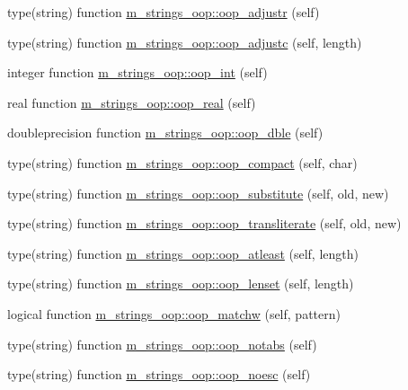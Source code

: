 \begin{DoxyCompactItemize}
\item 
type(string) function \mbox{\hyperlink{namespacem__strings__oop_abb0dfa5646259e4fc768700eada111ac}{m\+\_\+strings\+\_\+oop\+::oop\+\_\+adjustr}} (self)
\item 
type(string) function \mbox{\hyperlink{namespacem__strings__oop_a9fa932c23648e737230553a8e7bfb15b}{m\+\_\+strings\+\_\+oop\+::oop\+\_\+adjustc}} (self, length)
\item 
integer function \mbox{\hyperlink{namespacem__strings__oop_a2092266bec4014f74b8d436c5a8e319f}{m\+\_\+strings\+\_\+oop\+::oop\+\_\+int}} (self)
\item 
real function \mbox{\hyperlink{namespacem__strings__oop_a9709a714bc825704651b00c7384a7547}{m\+\_\+strings\+\_\+oop\+::oop\+\_\+real}} (self)
\item 
doubleprecision function \mbox{\hyperlink{namespacem__strings__oop_aa6eaf2b8a12a905d0ebaa21a84871dec}{m\+\_\+strings\+\_\+oop\+::oop\+\_\+dble}} (self)
\item 
type(string) function \mbox{\hyperlink{namespacem__strings__oop_ac02aecbaebcf57833b544de4f50c89a6}{m\+\_\+strings\+\_\+oop\+::oop\+\_\+compact}} (self, char)
\item 
type(string) function \mbox{\hyperlink{namespacem__strings__oop_af653c84bbd0165d1d4a3b61efe0472e8}{m\+\_\+strings\+\_\+oop\+::oop\+\_\+substitute}} (self, old, new)
\item 
type(string) function \mbox{\hyperlink{namespacem__strings__oop_ac88f27671dd1129023494bf2500ca7fd}{m\+\_\+strings\+\_\+oop\+::oop\+\_\+transliterate}} (self, old, new)
\item 
type(string) function \mbox{\hyperlink{namespacem__strings__oop_a3ee018293cef22d7314b2a9f0c78a319}{m\+\_\+strings\+\_\+oop\+::oop\+\_\+atleast}} (self, length)
\item 
type(string) function \mbox{\hyperlink{namespacem__strings__oop_ac8ca18186659b8759b08e5167a3effb5}{m\+\_\+strings\+\_\+oop\+::oop\+\_\+lenset}} (self, length)
\item 
logical function \mbox{\hyperlink{namespacem__strings__oop_ab88f5f814c08f1c93c95fcd0ba2a6779}{m\+\_\+strings\+\_\+oop\+::oop\+\_\+matchw}} (self, pattern)
\item 
type(string) function \mbox{\hyperlink{namespacem__strings__oop_a5959b2f967a6466c198b39a089ef8a68}{m\+\_\+strings\+\_\+oop\+::oop\+\_\+notabs}} (self)
\item 
type(string) function \mbox{\hyperlink{namespacem__strings__oop_ae1ed148f1ae0694ac093d3e11f9b702b}{m\+\_\+strings\+\_\+oop\+::oop\+\_\+noesc}} (self)

\end{DoxyCompactItemize}
